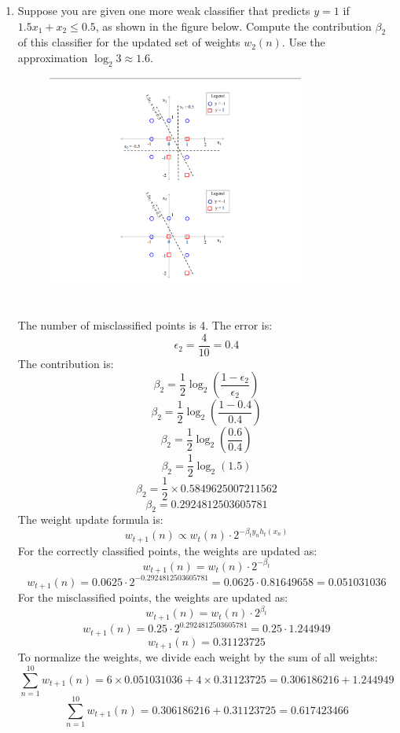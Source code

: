 \documentclass[a3paper,12pt]{extarticle} %
\begin{document}
\begin{enumerate}
\item Suppose you are given one more weak classifier that predicts $y = 1$ if $1.5x_1 + x_2 \leq 0.5$, as shown in the figure below. Compute the contribution $\beta_2$ of this classifier for the updated set of weights $w_2(n)$. Use the approximation $\log_2 3 \approx 1.6$.
\begin{figure}[h]
    \centering
    \includegraphics[width=0.8\textwidth]{adaboost3.png}
    \label{fig:primal}
\end{figure}
\\ The number of misclassified points is 4. The error is:
\[
\epsilon_2 = \frac{4}{10} = 0.4
\]
The contribution is:
\[
\beta_2 = \frac{1}{2} \log_2\left(\frac{1 - \epsilon_2}{\epsilon_2}\right)
\]
\[
\beta_2 = \frac{1}{2} \log_2\left(\frac{1 - 0.4}{0.4}\right)
\]
\[
\beta_2 = \frac{1}{2} \log_2\left(\frac{0.6}{0.4}\right)
\]
\[
\beta_2 = \frac{1}{2} \log_2\left(1.5\right)
\]
\[
\beta_2 = \frac{1}{2} \times 0.5849625007211562
\]
\[
\beta_2 = 0.2924812503605781
\]
The weight update formula is:
\[
w_{t+1}(n) \propto w_t(n) \cdot 2^{-\beta_t y_n h_t(x_n)}
\]
For the correctly classified points, the weights are updated as:
\[
w_{t+1}(n) = w_t(n) \cdot 2^{-\beta_t}
\]
\[
w_{t+1}(n) = 0.0625 \cdot 2^{-0.2924812503605781} = 0.0625 \cdot 0.81649658 = 0.051031036
\]
For the misclassified points, the weights are updated as:
\[
w_{t+1}(n) = w_t(n) \cdot 2^{\beta_t}
\]
\[
w_{t+1}(n) = 0.25 \cdot 2^{0.2924812503605781} = 0.25 \cdot 1.244949
\]
\[
w_{t+1}(n) = 0.31123725
\]
To normalize the weights, we divide each weight by the sum of all weights:
\[
\sum_{n=1}^{10} w_{t+1}(n) = 6 \times 0.051031036 + 4 \times 0.31123725 = 0.306186216 + 1.244949
\]
\[
\sum_{n=1}^{10} w_{t+1}(n) = 0.306186216 + 0.31123725 = 0.617423466
\]
\end{enumerate}
\end{document}
